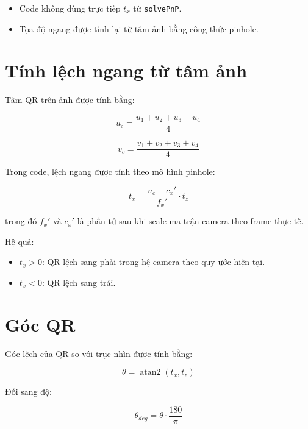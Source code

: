 \documentclass[12pt,a4paper]{article}
\begin{document}
\begin{itemize}
    \item Code không dùng trực tiếp $t_x$ từ \texttt{solvePnP}.
    \item Tọa độ ngang được tính lại từ tâm ảnh bằng công thức pinhole.
\end{itemize}

\section{Tính lệch ngang từ tâm ảnh}

Tâm QR trên ảnh được tính bằng:

\begin{equation}
u_c = \frac{u_1+u_2+u_3+u_4}{4}
\end{equation}

\begin{equation}
v_c = \frac{v_1+v_2+v_3+v_4}{4}
\end{equation}

Trong code, lệch ngang được tính theo mô hình pinhole:

\begin{equation}
t_x = \frac{u_c - c_x'}{f_x'} \cdot t_z
\end{equation}

trong đó $f_x'$ và $c_x'$ là phần tử sau khi scale ma trận camera theo frame thực tế.

Hệ quả:

\begin{itemize}
    \item $t_x > 0$: QR lệch sang phải trong hệ camera theo quy ước hiện tại.
    \item $t_x < 0$: QR lệch sang trái.
\end{itemize}

\section{Góc QR}

Góc lệch của QR so với trục nhìn được tính bằng:

\begin{equation}
\theta = \operatorname{atan2}(t_x, t_z)
\end{equation}

Đổi sang độ:

\begin{equation}
\theta_{deg} = \theta \cdot \frac{180}{\pi}
\end{equation}
\end{document}
